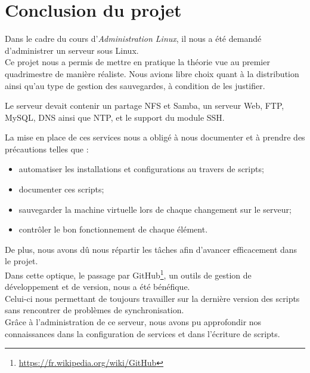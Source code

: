 \section{Conclusion du projet}
\label{sec:conclusion-projet}

Dans le cadre du cours d'\emph{Administration Linux}, il nous a été demandé
d'administrer un serveur sous Linux. \\

Ce projet nous a permis de mettre en pratique la théorie vue au premier
quadrimestre de manière réaliste. Nous avions libre choix quant à la distribution
ainsi qu'au type de gestion des sauvegardes, à condition de les justifier.

Le serveur devait contenir un partage NFS et Samba, un serveur Web, FTP, MySQL,
DNS ainsi que NTP, et le support du module SSH.

La mise en place de ces services nous a obligé à nous documenter et à prendre
des précautions telles que :
\begin{itemize}
\item automatiser les installations et configurations au travers de scripts;
\item documenter ces scripts;
\item sauvegarder la machine virtuelle lors de chaque changement sur le serveur;
\item contrôler le bon fonctionnement de chaque élément. \\
\end{itemize}

De plus, nous avons dû nous répartir les tâches afin d'avancer efficacement
dans le projet. \\
Dans cette optique, le passage par
GitHub\footnote{\url{https://fr.wikipedia.org/wiki/GitHub}}, un outils de
gestion de développement et de version, nous a été bénéfique. \\
Celui-ci nous permettant de toujours travailler sur la dernière version des
scripts sans rencontrer de problèmes de synchronisation. \\

Grâce à l'administration de ce serveur, nous avons pu approfondir nos
connaissances dans la configuration de services et dans l'écriture de scripts.


